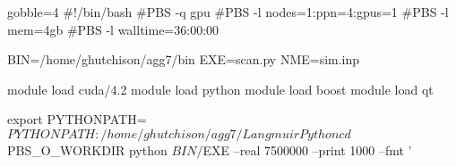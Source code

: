 \begin{bashcode*}{gobble=4}
    #!/bin/bash                  
    #PBS -q gpu                                                                            
    #PBS -l nodes=1:ppn=4:gpus=1                                                           
    #PBS -l mem=4gb                                                                        
    #PBS -l walltime=36:00:00                                                              
                                                                                        
    BIN=/home/ghutchison/agg7/bin                                                          
    EXE=scan.py                                                                            
    NME=sim.inp                                                                            
                                                                                        
    module load cuda/4.2                                                                   
    module load python                                                                     
    module load boost                                                                      
    module load qt                                                                         
                                                                                        
    export PYTHONPATH=$PYTHONPATH:/home/ghutchison/agg7/LangmuirPython                     
                                                                                        
    cd $PBS_O_WORKDIR                                                                      
    python $BIN/$EXE --real 7500000 --print 1000 --fmt '%
\end{bashcode*}

